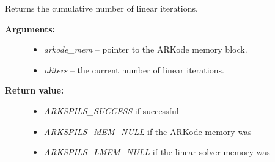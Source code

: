 \documentclass[letterpaper,10pt,english]{sphinxmanual}
\begin{document}
\begin{fulllineitems}
\label{c_interface/User_callable:ARKSpilsGetNumLinIters}
Returns the cumulative number of linear iterations.
\begin{description}
\item[{\textbf{Arguments:}}] \leavevmode\begin{itemize}
\item {} 
\emph{arkode\_mem} -- pointer to the ARKode memory block.

\item {} 
\emph{nliters} -- the current number of linear iterations.

\end{itemize}

\item[{\textbf{Return value:}}] \leavevmode\begin{itemize}
\item {} 
\emph{ARKSPILS\_SUCCESS} if successful

\item {} 
\emph{ARKSPILS\_MEM\_NULL} if the ARKode memory was 

\item {} 
\emph{ARKSPILS\_LMEM\_NULL} if the linear solver memory was 

\end{itemize}

\end{description}

\end{fulllineitems}

\end{document}
